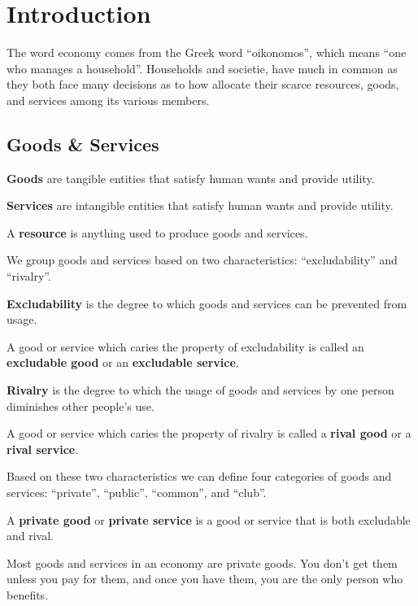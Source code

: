 \section{Introduction}

The word economy comes from the Greek word ``oikonomos'', which means ``one who manages a household''. Households and
societie, have much in common as they both face many decisions as to how allocate their scarce resources, goods, and
services among its various members.

\subsection{Goods \& Services}

\bd[Goods]
\textbf{Goods} are tangible entities that satisfy human wants and provide utility.
\ed

\bd[Services]
\textbf{Services} are intangible entities that satisfy human wants and provide utility.
\ed

\bd[Resource]
A \textbf{resource} is anything used to produce goods and services.
\ed

We group goods and services based on two characteristics: ``excludability'' and ``rivalry''.

\bd[Excludability]
\textbf{Excludability} is the degree to which goods and services can be prevented from usage.
\ed

A good or service which caries the property of excludability is called an \textbf{excludable good} or an
\textbf{excludable service}.
\ed

\bd[Rivalry]
\textbf{Rivalry} is the degree to which the usage of goods and services by one person diminishes other people's use.
\ed

A good or service which caries the property of rivalry is called a \textbf{rival good} or a \textbf{rival service}.
\ed

Based on these two characteristics we can define four categories of goods and services: ``private'', ``public'',
``common'', and ``club''.

A \textbf{private good} or \textbf{private service} is a good or service that is both excludable and rival.
\ed

Most goods and services in an economy are private goods. You don't get them unless you pay for them, and once you have
them, you are the only person who benefits.

